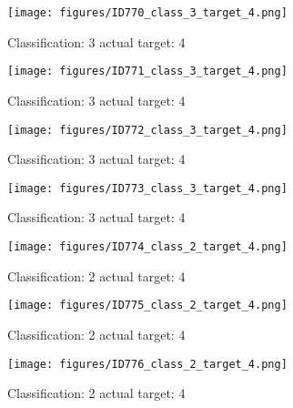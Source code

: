 \begin{figure}[h!]
\begin{center}
\texttt{[image: figures/ID770\_class\_3\_target\_4.png]}
\end{center}
\caption{ Classification: 3 actual target: 4}
\label{fig:ID770_class_3_target_4}
\end{figure}
\begin{figure}[h!]
\begin{center}
\texttt{[image: figures/ID771\_class\_3\_target\_4.png]}
\end{center}
\caption{ Classification: 3 actual target: 4}
\label{fig:ID771_class_3_target_4}
\end{figure}
\begin{figure}[h!]
\begin{center}
\texttt{[image: figures/ID772\_class\_3\_target\_4.png]}
\end{center}
\caption{ Classification: 3 actual target: 4}
\label{fig:ID772_class_3_target_4}
\end{figure}
\begin{figure}[h!]
\begin{center}
\texttt{[image: figures/ID773\_class\_3\_target\_4.png]}
\end{center}
\caption{ Classification: 3 actual target: 4}
\label{fig:ID773_class_3_target_4}
\end{figure}
\begin{figure}[h!]
\begin{center}
\texttt{[image: figures/ID774\_class\_2\_target\_4.png]}
\end{center}
\caption{ Classification: 2 actual target: 4}
\label{fig:ID774_class_2_target_4}
\end{figure}
\begin{figure}[h!]
\begin{center}
\texttt{[image: figures/ID775\_class\_2\_target\_4.png]}
\end{center}
\caption{ Classification: 2 actual target: 4}
\label{fig:ID775_class_2_target_4}
\end{figure}
\begin{figure}[h!]
\begin{center}
\texttt{[image: figures/ID776\_class\_2\_target\_4.png]}
\end{center}
\caption{ Classification: 2 actual target: 4}
\label{fig:ID776_class_2_target_4}
\end{figure}
